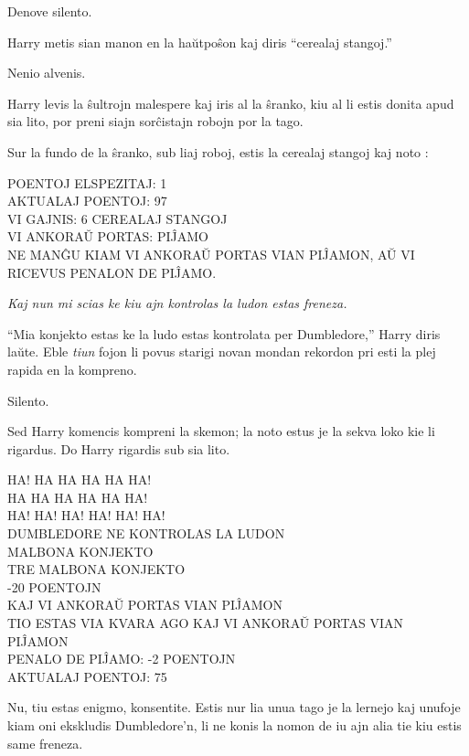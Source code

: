 Denove silento.

Harry metis sian manon en la haŭtpoŝon kaj diris ``cerealaj stangoj.''

Nenio alvenis.

Harry levis la ŝultrojn malespere kaj iris al la ŝranko, kiu al li estis donita
apud sia lito, por preni siajn sorĉistajn robojn por la tago.

Sur la fundo de la ŝranko, sub liaj roboj, estis la cerealaj stangoj
kaj noto :

\medskip
\begin{center}
  POENTOJ ELSPEZITAJ: 1\\
  AKTUALAJ POENTOJ: 97\\
  VI GAJNIS: 6 CEREALAJ STANGOJ\\
  VI ANKORAŬ PORTAS: PIĴAMO\\
  NE MANĜU KIAM VI ANKORAŬ PORTAS VIAN PIĴAMON, AŬ VI RICEVUS PENALON DE PIĴAMO.
\end{center}
\medskip

\emph{Kaj nun mi scias ke kiu ajn kontrolas la ludon estas freneza.}

``Mia konjekto estas ke la ludo estas kontrolata per Dumbledore,''
Harry diris laŭte. Eble \emph{tiun} fojon li povus starigi novan mondan
rekordon pri esti la plej rapida en la kompreno.

Silento.

Sed Harry komencis kompreni la skemon; la noto estus je la sekva loko
kie li rigardus. Do Harry rigardis sub sia lito.

\medskip
\begin{center}
  HA! HA HA HA HA HA!\\
  HA HA HA HA HA HA!\\
  HA! HA! HA! HA! HA! HA!\\
  DUMBLEDORE NE KONTROLAS LA LUDON\\
  MALBONA KONJEKTO\\
  TRE MALBONA KONJEKTO\\
  -20 POENTOJN\\
  KAJ VI ANKORAŬ PORTAS VIAN PIĴAMON\\
  TIO ESTAS VIA KVARA AGO KAJ VI ANKORAŬ PORTAS VIAN PIĴAMON\\
  PENALO DE PIĴAMO: -2 POENTOJN\\
  AKTUALAJ POENTOJ: 75
\end{center}

Nu, tiu estas enigmo, konsentite. Estis nur lia unua tago je la lernejo kaj
unufoje kiam oni ekskludis Dumbledore'n, li ne konis la nomon de iu ajn alia tie
kiu estis same freneza.

